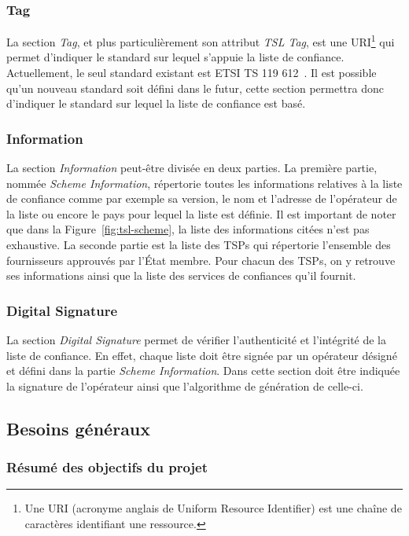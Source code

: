 \documentclass{tnreport}
\begin{document}
\subsubsection{Tag}

La section \textit{Tag}, et plus particulièrement son attribut \textit{TSL Tag}, est une URI\footnote{Une URI (acronyme anglais de Uniform Resource Identifier) est une chaîne de caractères identifiant une ressource.} qui permet d'indiquer le standard sur lequel s'appuie la liste de confiance. Actuellement, le seul standard  existant est ETSI TS 119 612~\cite{ETSITS119612}. Il est possible qu'un nouveau standard soit défini dans le futur, cette section permettra donc d'indiquer le standard sur lequel la liste de confiance est basé.

\subsubsection{Information}

La section \textit{Information} peut-être divisée en deux parties. 
La première partie, nommée \textit{Scheme Information}, répertorie toutes les informations relatives à la liste de confiance comme par exemple sa version, le nom et l'adresse de l'opérateur de la liste ou encore le pays pour lequel la liste est définie. Il est important de noter que dans la Figure~\ref{fig:tsl-scheme}, la liste des informations citées n'est pas exhaustive. 
La seconde partie est la liste des TSPs qui répertorie l'ensemble des fournisseurs approuvés par l'État membre. Pour chacun des TSPs, on y retrouve ses informations ainsi que la liste des services de confiances qu'il fournit.

\subsubsection{Digital Signature}

La section \textit{Digital Signature} permet de vérifier l'authenticité et l'intégrité de la liste de confiance. En effet, chaque liste doit être signée par un opérateur désigné et défini dans la partie \textit{Scheme Information}. Dans cette section doit être indiquée la signature de l'opérateur ainsi que l'algorithme de génération de celle-ci.

\subsection{Besoins généraux}

\subsubsection{Résumé des objectifs du projet}
\end{document}
